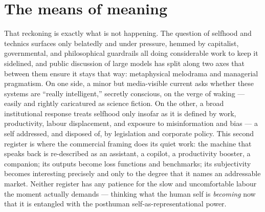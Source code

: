 \section{The means of meaning}

That reckoning is exactly what is not happening. The question of selfhood and technics surfaces only belatedly and under pressure, hemmed by capitalist, governmental, and philosophical guardrails all doing considerable work to keep it sidelined, and public discussion of large models has split along two axes that between them ensure it stays that way: metaphysical melodrama and managerial pragmatism. On one side, a minor but media-visible current asks whether these systems are ``really intelligent,'' secretly conscious, on the verge of waking --- easily and rightly caricatured as science fiction. On the other, a broad institutional response treats selfhood only insofar as it is defined by work, productivity, labour displacement, and exposure to misinformation and bias --- a self addressed, and disposed of, by legislation and corporate policy. This second register is where the commercial framing does its quiet work: the machine that speaks back is re-described as an assistant, a copilot, a productivity booster, a companion; its outputs become loss functions and benchmarks; its subjectivity becomes interesting precisely and only to the degree that it names an addressable market. Neither register has any patience for the slow and uncomfortable labour the moment actually demands --- thinking what the human self is \textit{becoming} now that it is entangled with the posthuman self-as-representational power.

